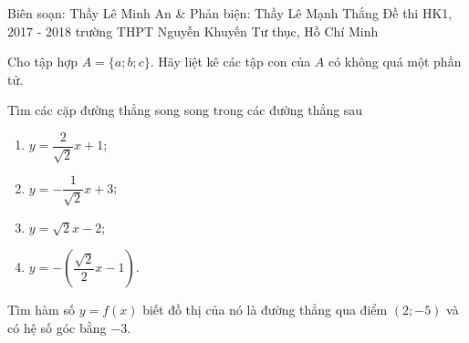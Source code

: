\begin{name}
{Biên soạn: Thầy Lê Minh An \& Phản biện: Thầy Lê Mạnh Thắng}
{Đề thi HK1, 2017 - 2018 trường THPT Nguyễn Khuyến Tư thục, Hồ Chí Minh}
\end{name}

\setcounter{bt}{0}

\begin{bt}%
Cho tập hợp $A=\{a;b;c\}$. Hãy liệt kê các tập con của $A$ có không quá một phần tử.
\end{bt}

\begin{bt}%
Tìm các cặp đường thẳng song song trong các đường thẳng sau
\begin{multicols}{2}
\begin{enumerate}
\item $y=\dfrac{2}{\sqrt{2}}x+1$;
\item $y=-\dfrac{1}{\sqrt{2}}x+3$;
\item $y=\sqrt{2}x-2$;
\item $y=-\left(\dfrac{\sqrt{2}}{2}x-1\right)$.
\end{enumerate}
\end{multicols}
\end{bt}

\begin{bt}%
Tìm hàm số $y=f(x)$ biết đồ thị của nó là đường thẳng qua điểm $(2;-5)$ và có hệ số góc bằng $-3$.
\end{bt}

